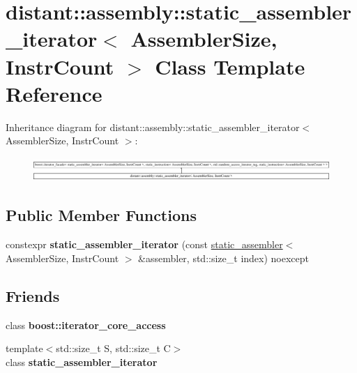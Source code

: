 \hypertarget{classdistant_1_1assembly_1_1static__assembler__iterator}{}\section{distant\+:\+:assembly\+:\+:static\+\_\+assembler\+\_\+iterator$<$ Assembler\+Size, Instr\+Count $>$ Class Template Reference}
\label{classdistant_1_1assembly_1_1static__assembler__iterator}
Inheritance diagram for distant\+:\+:assembly\+:\+:static\+\_\+assembler\+\_\+iterator$<$ Assembler\+Size, Instr\+Count $>$\+:\begin{figure}[H]
\begin{center}
\leavevmode
\includegraphics[height=0.916530cm]{classdistant_1_1assembly_1_1static__assembler__iterator}
\end{center}
\end{figure}
\subsection*{Public Member Functions}
\begin{DoxyCompactItemize}
\item 
\mbox{\label{classdistant_1_1assembly_1_1static__assembler__iterator_a62f897d79152940b480de52bbeeed76e}} 
constexpr {\bfseries static\+\_\+assembler\+\_\+iterator} (const \mbox{\hyperlink{classdistant_1_1assembly_1_1static__assembler}{static\+\_\+assembler}}$<$ Assembler\+Size, Instr\+Count $>$ \&assembler, std\+::size\+\_\+t index) noexcept
\end{DoxyCompactItemize}
\subsection*{Friends}
\begin{DoxyCompactItemize}
\item 
\mbox{\label{classdistant_1_1assembly_1_1static__assembler__iterator_ac09f73e325921cc50ebcd96bed0f8096}} 
class {\bfseries boost\+::iterator\+\_\+core\+\_\+access}
\item 
\mbox{\label{classdistant_1_1assembly_1_1static__assembler__iterator_a4dac94e37604f6ccf8734bdc7c336ea9}} 
{\footnotesize template$<$std\+::size\+\_\+t S, std\+::size\+\_\+t C$>$ }\\class {\bfseries static\+\_\+assembler\+\_\+iterator}
\end{DoxyCompactItemize}


